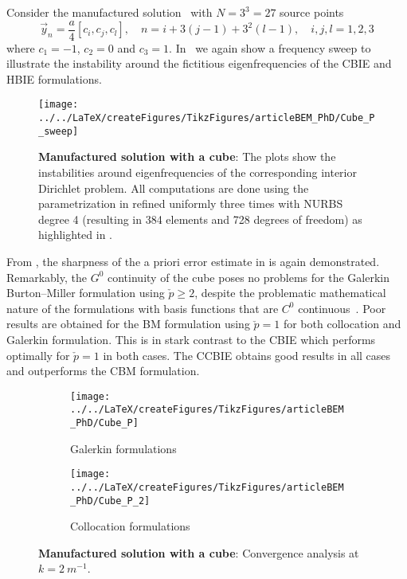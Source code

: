 Consider the manufactured solution~ with $N=3^3=27$ source points 
\begin{equation*}
	\vec{y}_n = \frac{a}{4}[c_i, c_j, c_l],\quad n=i+3(j-1)+3^2(l-1),\quad i,j,l=1,2,3
\end{equation*}
where $c_1=-1$, $c_2=0$ and $c_3=1$. In~ we again show a frequency sweep to illustrate the instability around the fictitious eigenfrequencies of the CBIE and HBIE formulations.
\begin{figure}
	\centering
	\texttt{[image: ../../LaTeX/createFigures/TikzFigures/articleBEM\_PhD/Cube\_P\_sweep]}
	\caption{\textbf{Manufactured solution with a cube}: The plots show the instabilities around eigenfrequencies of the corresponding interior Dirichlet problem. All computations are done using the parametrization in  refined uniformly three times with NURBS degree 4 (resulting in 384 elements and 728 degrees of freedom) as highlighted in .}
	\label{Fig3:Cube_P_sweep}
\end{figure}
From , the sharpness of the a priori error estimate in  is again demonstrated. Remarkably, the $G^0$ continuity of the cube poses no problems for the Galerkin Burton--Miller formulation using $\check{p}\geq 2$, despite the problematic mathematical nature of the formulations with basis functions that are $C^0$ continuous~\cite{Liu1999anf}. Poor results are obtained for the BM formulation using $\check{p}=1$ for both collocation and Galerkin formulation. This is in stark contrast to the CBIE which performs optimally for $\check{p}=1$ in both cases. The CCBIE obtains good results in all cases and outperforms the CBM formulation.
\begin{figure}
	\centering
	\begin{subfigure}[t]{\textwidth}
		\texttt{[image: ../../LaTeX/createFigures/TikzFigures/articleBEM\_PhD/Cube\_P]}
		\caption{Galerkin formulations}
		\label{Fig3:Cube_P1}
	\end{subfigure} 
	\par\bigskip
	\par\bigskip
	\begin{subfigure}[t]{\textwidth}
		\texttt{[image: ../../LaTeX/createFigures/TikzFigures/articleBEM\_PhD/Cube\_P\_2]}
		\caption{Collocation formulations}
		\label{Fig3:Cube_P2}
	\end{subfigure} 
	\caption{\textbf{Manufactured solution with a cube}: Convergence analysis at $k=\SI{2}{m^{-1}}$.}
	\label{Fig3:Cube_P}
\end{figure}


